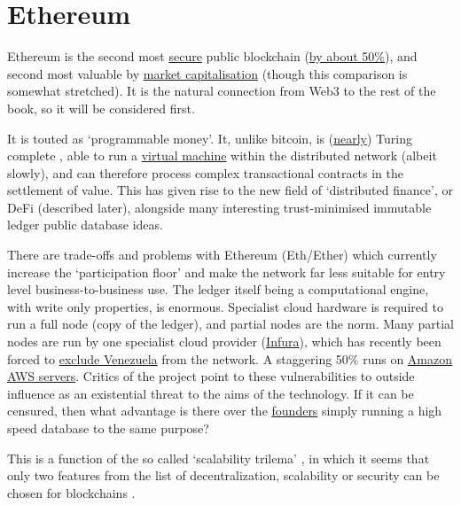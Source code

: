 \section{Ethereum}
Ethereum \cite{buterin2013ethereum} is the second most \href{https://www.crypto51.app/}{secure} public blockchain (\href{https://howmanyconfs.com/}{by about 50\%})\cite{sayeed2019assessing}, and second most valuable by \href{https://coinmarketcap.com/}{market capitalisation} (though this comparison is somewhat stretched). It is the natural connection from Web3 to the rest of the book, so it will be considered first.\par
It is touted as `programmable money'. It, unlike bitcoin, is (\href{https://hackernoon.com/turing-completeness-and-the-ethereum-blockchain-c5a93b865c1a}{nearly}) Turing complete \cite{petzold2008annotated}, able to run a \href{https://ethereum.org/en/developers/docs/evm/}{virtual machine} within the distributed network (albeit slowly), and can therefore process complex transactional contracts in the settlement of value. This has given rise to the new field of `distributed finance', or DeFi (described later), alongside many interesting trust-minimised immutable ledger public database ideas. \par
There are trade-offs and problems with Ethereum (Eth/Ether) which currently increase the `participation floor' and make the network far less suitable for entry level business-to-business use. The ledger itself being a computational engine, with write only properties, is enormous. Specialist cloud hardware is required to run a full node (copy of the ledger), and partial nodes are the norm. Many partial nodes are run by one specialist cloud provider (\href{https://consensys.net/blog/news/why-infura-is-the-secret-weapon-of-ethereum-infrastructure/}{Infura}), which has recently been forced to \href{https://finance.yahoo.com/news/metamask-infura-block-certain-areas-173749914.html}{exclude Venezuela} from the network. A staggering 50\% runs on \href{https://ethernodes.org/networkType/Hosting}{Amazon AWS servers}. Critics of the project point to these vulnerabilities to outside influence as an existential threat to the aims of the technology. If it can be censured, then what advantage is there over the \href{https://protos.com/consensys-lawsuit-jpmorgan-owns-critical-ethereum-infrastructure/}{founders} simply running a high speed database to the same purpose? \par
This is a function of the so called `scalability trilema' \cite{hafid2020scaling}, in which it seems that only two features from the list of decentralization, scalability or security can be chosen for blockchains \cite{bonneau2015sok}.\par
